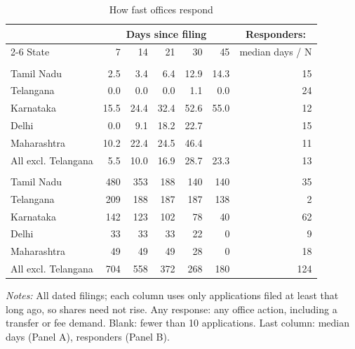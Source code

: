 \begin{table}[!htbp]
\centering
\caption{How fast offices respond}
\label{tab:tab_speed}
\small
\begin{threeparttable}
\begin{tabular}{lrrrrrr}
\toprule
& \multicolumn{5}{c}{Days since filing} & \multicolumn{1}{c}{Responders:} \\ \cmidrule(lr){2-6} State & 7 & 14 & 21 & 30 & 45 & median days / N \\
\midrule
\addlinespace\multicolumn{7}{l}{\textit{Panel A. Any response by this day (\%)}} \\
Tamil Nadu & 2.5 & 3.4 & 6.4 & 12.9 & 14.3 & 15 \\
Telangana & 0.0 & 0.0 & 0.0 & 1.1 & 0.0 & 24 \\
Karnataka & 15.5 & 24.4 & 32.4 & 52.6 & 55.0 & 12 \\
Delhi & 0.0 & 9.1 & 18.2 & 22.7 &  & 15 \\
Maharashtra & 10.2 & 22.4 & 24.5 & 46.4 &  & 11 \\
All excl. Telangana & 5.5 & 10.0 & 16.9 & 28.7 & 23.3 & 13 \\
\addlinespace\multicolumn{7}{l}{\textit{Panel B. Applications exposed at least this long (N)}} \\
Tamil Nadu & 480 & 353 & 188 & 140 & 140 & 35 \\
Telangana & 209 & 188 & 187 & 187 & 138 & 2 \\
Karnataka & 142 & 123 & 102 & 78 & 40 & 62 \\
Delhi & 33 & 33 & 33 & 22 & 0 & 9 \\
Maharashtra & 49 & 49 & 49 & 28 & 0 & 18 \\
All excl. Telangana & 704 & 558 & 372 & 268 & 180 & 124 \\
\bottomrule
\end{tabular}
\begin{tablenotes}[flushleft]\footnotesize
\item \textit{Notes:} All dated filings; each column uses only applications filed at least that long ago, so shares need not rise. Any response: any office action, including a transfer or fee demand. Blank: fewer than 10 applications. Last column: median days (Panel A), responders (Panel B).
\end{tablenotes}
\end{threeparttable}
\end{table}
